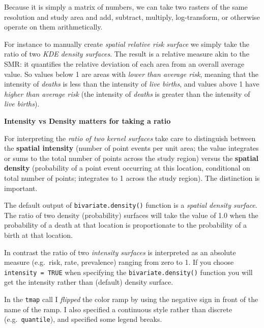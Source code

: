 \documentclass[
]{book}
\newenvironment{rmdcaution}[1]
  {
  \begin{itemize}
  \renewcommand{\labelitemi}{
    \raisebox{-.7\height}[0pt][0pt]{
      {\setkeys{Gin}{width=3em,keepaspectratio}\texttt{[image: images/\#1]}}
    }
  }
  \setlength{\fboxsep}{1em}
  \begin{caution}
  \item
  }
  {
  \end{caution}
  \end{itemize}
  }
\begin{document}
Because it is simply a matrix of numbers, we can take two rasters of the same resolution and study area and add, subtract, multiply, log-transform, or otherwise operate on them arithmetically.

For instance to manually create \emph{spatial relative risk surface} we simply take the ratio of two \emph{KDE density surfaces}. The result is a relative measure akin to the SMR: it quantifies the relative deviation of each area from an overall average value. So values below 1 are areas with \emph{lower than average risk}, meaning that the intensity of \emph{deaths} is less than the intensity of \emph{live births}, and values above 1 have \emph{higher than average risk} (the intensity of \emph{deaths} is greater than the intensity of \emph{live births}).

\begin{rmdcaution}{caution}
\textbf{Intensity vs Density matters for taking a ratio}

For interpreting the \emph{ratio of two kernel surfaces} take care to distinguish between the \textbf{spatial intensity} (number of point events per unit area; the value integrates or sums to the total number of points across the study region) versus the \textbf{spatial density} (probability of a point event occurring at this location, conditional on total number of points; integrates to 1 across the study region). The distinction is important.

The default output of \texttt{bivariate.density()} function is a \emph{spatial density surface}. The ratio of two density (probability) surfaces will take the value of 1.0 when the probability of a death at that location is proportionate to the probability of a birth at that location.

In contrast the ratio of two \emph{intensity surfaces} is interpreted as an absolute measure (e.g.~risk, rate, prevalence) ranging from zero to 1. If you choose \texttt{intensity\ =\ TRUE} when specifying the \texttt{bivariate.density()} function you will get the intensity rather than (default) density surface.

\end{rmdcaution}

In the \texttt{tmap} call I \emph{flipped} the color ramp by using the negative sign in front of the name of the ramp. I also specified a continuous style rather than discrete (e.g.~\texttt{quantile}), and specified some legend breaks.
\end{document}
